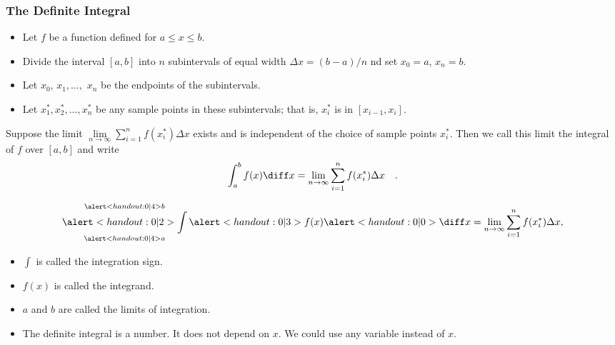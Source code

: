 \begin{frame}\frametitle{ %
The Definite Integral}
\begin{definition}
\begin{itemize}
\item  Let $f$ be a function defined for $a\leq x\leq b$.
\item  Divide the interval $[a,b]$ into $n$ subintervals of equal width $\Delta x = (b-a)/n$ nd set $x_0=a$, $x_n=b$.
\item  Let $x_0$, $x_1,\ldots ,$ $x_n $ be the endpoints of the subintervals.
\item  Let $x_1^*, x_2^*, \ldots , x_n^*$ be any sample points in these subintervals; that is, $x_i^*$ is in $[x_{i-1},x_i]$.  
\end{itemize}
\abovedisplayskip=0pt
\belowdisplayskip=0pt
Suppose the limit $\lim\limits_{n\to \infty} \sum\limits_{i=1}^n f(x_i^*)\Delta x$ exists and is independent of the choice of sample points $x_i^*$. Then we call this limit the integral of $f$ over $[a,b]$ and write
\[
\int_a^b f(x) \diff x = \lim_{n\to \infty} \sum_{i=1}^n f(x_i^*)\Delta x \quad .
\]
\end{definition}
\end{frame}

\begin{frame}
\[
\mathop{\alert<handout:0| 2>{\int}}_{\alert<handout:0| 4>{a}}^{\alert<handout:0| 4>{b}} \alert<handout:0| 3>{f(x)} \alert<handout:0| 0>{\diff x} = \lim_{n\to \infty} \sum_{i=1}^n f(x_i^*)\Delta x,
\]
\begin{itemize}
\item<1-| alert@2>  $\int$ is called the integration sign.
\item<1-| alert@3>  $f(x)$ is called the integrand.
\item<1-| alert@4>  $a$ and $b$ are called the limits of integration.
\item<5->  The definite integral is a number.  It does not depend on $x$.  We could use any variable instead of $x$.
\end{itemize}
%
\end{frame}
